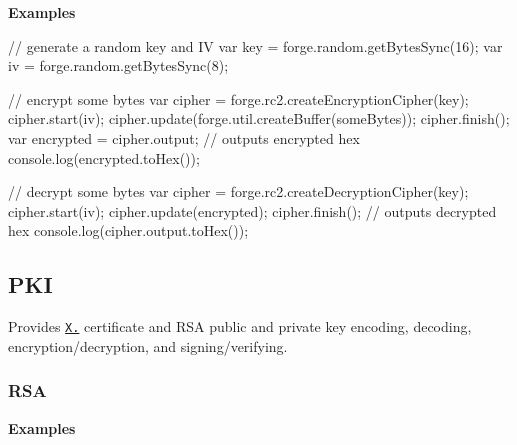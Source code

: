 {\bfseries Examples}


\begin{DoxyCode}
// generate a random key and IV
var key = forge.random.getBytesSync(16);
var iv = forge.random.getBytesSync(8);

// encrypt some bytes
var cipher = forge.rc2.createEncryptionCipher(key);
cipher.start(iv);
cipher.update(forge.util.createBuffer(someBytes));
cipher.finish();
var encrypted = cipher.output;
// outputs encrypted hex
console.log(encrypted.toHex());

// decrypt some bytes
var cipher = forge.rc2.createDecryptionCipher(key);
cipher.start(iv);
cipher.update(encrypted);
cipher.finish();
// outputs decrypted hex
console.log(cipher.output.toHex());
\end{DoxyCode}


 \subsection*{P\+KI}

Provides \href{http://en.wikipedia.org/wiki/X.509}{\tt X.} certificate and R\+SA public and private key encoding, decoding, encryption/decryption, and signing/verifying.

\label{_rsa}%
 \subsubsection*{R\+SA}

{\bfseries Examples}


